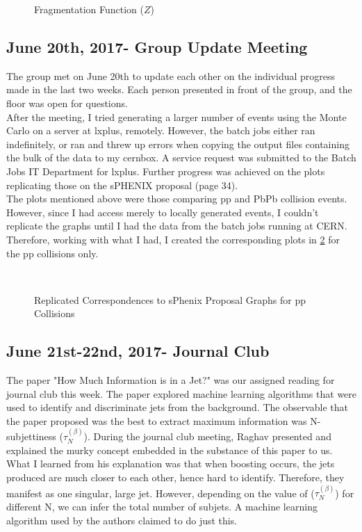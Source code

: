 \documentclass{article}
\begin{document}
\begin{figure}[H]
\centering
{} 
\caption{Fragmentation Function ($Z$)}
\label{fig:frag}
\end{figure}

\subsection{June 20th, 2017- Group Update Meeting}
The group met on June 20th to update each other on the individual progress made in the last two weeks. Each person presented in front of the group, and the floor was open for questions.
\\
After the meeting, I tried generating a larger number of events using the Monte Carlo on a server at lxplus, remotely. However, the batch jobs either ran indefinitely, or ran and threw up errors when copying the output files containing the bulk of the data to my cernbox. A service request was submitted to the Batch Jobs IT Department for lxplus.
Further progress was achieved on the plots replicating those on the sPHENIX proposal (page 34).
\\The plots mentioned above were those comparing pp and PbPb collision events. However, since I had access merely to locally generated events, I couldn't replicate the graphs until I had the data from the batch jobs running at CERN. Therefore, working with what I had, I created the corresponding plots in \ref{fig:delphi} for the pp collisions only.

\begin{figure}[H]
\centering
{} 
\\
\caption{Replicated Correspondences to sPhenix Proposal Graphs for pp Collisions}
\label{fig:delphi}
\end{figure}

\subsection{June 21st-22nd, 2017- Journal Club}
The paper "How Much Information is in a Jet?" was our assigned reading for journal club this week. The paper explored machine learning algorithms that were used to identify and discriminate jets from the background. The observable that the paper proposed was the best to extract maximum information was N-subjettiness ($\tau_{N}^{(\beta)}$). During the journal club meeting, Raghav presented and explained the murky concept embedded in the substance of this paper to us. What I learned from his explanation was that when boosting occurs, the jets produced are much closer to each other, hence hard to identify. Therefore, they manifest as one singular, large jet. However, depending on the value of ($\tau_{N}^{(\beta)}$) for different N, we can infer the total number of subjets. A machine learning algorithm used by the authors claimed to do just this.
\end{document}
